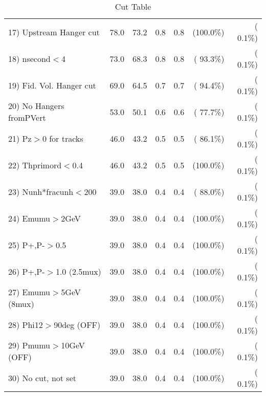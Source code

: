 \begin{table}[h!]
\begin{tabular}{||l||r|r|r|r|r|r||}
 17) Upstream Hanger cut  &         78.0 &         73.2 &          0.8 &          0.8 & (100.0\%) & (  0.1\%) \\
 18) nsecond$<$4          &         73.0 &         68.3 &          0.8 &          0.8 & ( 93.3\%) & (  0.1\%) \\
 19) Fid. Vol. Hanger cut &         69.0 &         64.5 &          0.7 &          0.7 & ( 94.4\%) & (  0.1\%) \\
 20) No Hangers fromPVert &         53.0 &         50.1 &          0.6 &          0.6 & ( 77.7\%) & (  0.1\%) \\
 21) Pz$>$0 for tracks    &         46.0 &         43.2 &          0.5 &          0.5 & ( 86.1\%) & (  0.1\%) \\
 22) Thprimord$<$0.4      &         46.0 &         43.2 &          0.5 &          0.5 & (100.0\%) & (  0.1\%) \\
 23) Nunh*fracunh$<$200   &         39.0 &         38.0 &          0.4 &          0.4 & ( 88.0\%) & (  0.1\%) \\
 24) Emumu$>$2GeV         &         39.0 &         38.0 &          0.4 &          0.4 & (100.0\%) & (  0.1\%) \\
 25) P+,P-$>$0.5          &         39.0 &         38.0 &          0.4 &          0.4 & (100.0\%) & (  0.1\%) \\
 26) P+,P-$>$1.0 (2.5mux) &         39.0 &         38.0 &          0.4 &          0.4 & (100.0\%) & (  0.1\%) \\
 27) Emumu$>$5GeV  (8mux) &         39.0 &         38.0 &          0.4 &          0.4 & (100.0\%) & (  0.1\%) \\
 28) Phi12$>$90deg  (OFF) &         39.0 &         38.0 &          0.4 &          0.4 & (100.0\%) & (  0.1\%) \\
 29) Pmumu$>$10GeV  (OFF) &         39.0 &         38.0 &          0.4 &          0.4 & (100.0\%) & (  0.1\%) \\
 30) No cut, not set      &         39.0 &         38.0 &          0.4 &          0.4 & (100.0\%) & (  0.1\%) \\
 \hline
 \hline
 \end{tabular}
 \caption{Cut Table           }
 \label{tab-cutcohjpsi-mumu_anuecc}
 \end{table}
